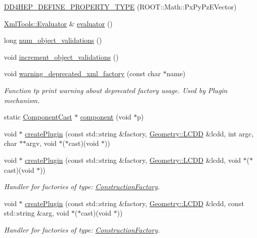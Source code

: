 \begin{DoxyCompactItemize}
\hyperlink{namespace_d_d4hep_a8b032fe993ba835daea31abfe2fa1d19}{D\+D4\+H\+E\+P\+\_\+\+D\+E\+F\+I\+N\+E\+\_\+\+P\+R\+O\+P\+E\+R\+T\+Y\+\_\+\+T\+Y\+PE} (R\+O\+O\+T\+::\+Math\+::\+Px\+Py\+Pz\+E\+Vector)
\item 
\hyperlink{class_xml_tools_1_1_evaluator}{Xml\+Tools\+::\+Evaluator} \& \hyperlink{namespace_d_d4hep_a5a6983dcc5d95a8aad6910ad842f0b6e}{evaluator} ()
\item 
long \hyperlink{namespace_d_d4hep_a022862a49c9bd20d654f90dbcb88c14f}{num\+\_\+object\+\_\+validations} ()
\item 
void \hyperlink{namespace_d_d4hep_a74a35c08bae34ad9a479a1726eafab98}{increment\+\_\+object\+\_\+validations} ()
\item 
void \hyperlink{namespace_d_d4hep_a1726e0eed52fa5804e004e72e8c73775}{warning\+\_\+deprecated\+\_\+xml\+\_\+factory} (const char $\ast$name)
\begin{DoxyCompactList}\small\item\em Function tp print warning about deprecated factory usage. Used by Plugin mechanism. \end{DoxyCompactList}\item 
static \hyperlink{class_d_d4hep_1_1_component_cast}{Component\+Cast} $\ast$ \hyperlink{namespace_d_d4hep_a9bd7c6fd6580a172a3d0a09eb3ea4793}{component} (void $\ast$p)
\item 
void $\ast$ \hyperlink{namespace_d_d4hep_ade40a96f4a17f0bf9cc042946bf4a5aa}{create\+Plugin} (const std\+::string \&factory, \hyperlink{class_d_d4hep_1_1_geometry_1_1_l_c_d_d}{Geometry\+::\+L\+C\+DD} \&lcdd, int argc, char $\ast$$\ast$argv, void $\ast$($\ast$cast)(void $\ast$))
\item 
void $\ast$ \hyperlink{namespace_d_d4hep_a65fff585aba587323f89c263548cad90}{create\+Plugin} (const std\+::string \&factory, \hyperlink{class_d_d4hep_1_1_geometry_1_1_l_c_d_d}{Geometry\+::\+L\+C\+DD} \&lcdd, void $\ast$($\ast$cast)(void $\ast$))
\begin{DoxyCompactList}\small\item\em Handler for factories of type\+: \hyperlink{class_d_d4hep_1_1_construction_factory}{Construction\+Factory}. \end{DoxyCompactList}\item 
void $\ast$ \hyperlink{namespace_d_d4hep_a65c21de63646aa8b39d14ad64e75528e}{create\+Plugin} (const std\+::string \&factory, \hyperlink{class_d_d4hep_1_1_geometry_1_1_l_c_d_d}{Geometry\+::\+L\+C\+DD} \&lcdd, const std\+::string \&arg, void $\ast$($\ast$cast)(void $\ast$))
\begin{DoxyCompactList}\small\item\em Handler for factories of type\+: \hyperlink{class_d_d4hep_1_1_construction_factory}{Construction\+Factory}. \end{DoxyCompactList}\item 
$$
\end{DoxyCompactItemize}
